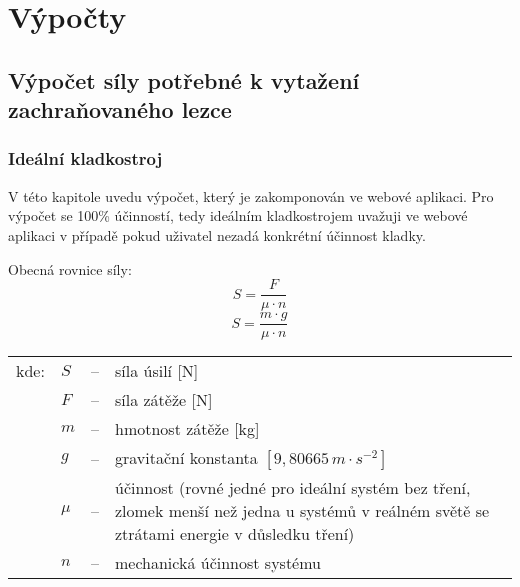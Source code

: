 \chapter{Výpočty}
\label{Vypocty}
\def\figurename{Obr.} %
\def\tablename{Tab.} %
\def\figureautorefname{obr.} %
\def\tableautorefname{tab.} %
\def\chapterautorefname{kapitola} %

\section{Výpočet síly potřebné k vytažení zachraňovaného lezce}
\subsection{Ideální kladkostroj}
V této kapitole uvedu výpočet, který je zakomponován ve webové aplikaci. Pro výpočet se 100\% účinností, tedy ideálním kladkostrojem uvažuji ve webové aplikaci v případě pokud uživatel nezadá konkrétní účinnost kladky.

\noindent Obecná rovnice síly:
\begin{equation}
    \label{eqn:basic_forces}
    S = \frac{F}{\mu \cdot n}
\end{equation}
\begin{equation}
    \label{eqn:basic_forces_2}
    S = \frac{m \cdot g}{\mu \cdot n}
\end{equation}

\begin{tabular}{l l c p{9.75cm}}
    kde: \hspace{0.25cm} & $S$ & -- & síla úsilí [N]\\
    \hspace{0.25cm} & $F$ & -- & síla zátěže [N]\\
    \hspace{0.25cm} & $m$ & -- & hmotnost zátěže [kg]\\
    \hspace{0.25cm} & $g$ & -- & gravitační konstanta $[9,80665\,m \cdot s^{-2}]$\\
    \hspace{0.25cm} & $\mu$ & -- & účinnost (rovné jedné pro ideální systém bez tření, zlomek menší než jedna u systémů v reálném světě se ztrátami energie v důsledku tření)\\
    \hspace{0.25cm} & $n$ & -- & mechanická účinnost systému\\
\end{tabular}
\\

